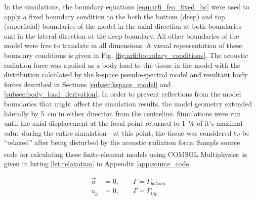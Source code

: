 			In the simulations, the boundary equations \ref{equ:arfi_fea_fixed_bc} were used to apply a fixed boundary condition to the both the bottom (deep) and top (superficial) boundaries of the model in the axial direction at both boundaries and in the lateral direction at the deep boundary. All other boundaries of the model were free to translate in all dimensions. A visual representation of these boundary conditions is given in Fig. \ref{fig:arfi:boundary_conditions}. The acoustic radiation force was applied as a body load to the tissue in the model with the distribution calculated by the k-space pseudo-spectral model and resultant body forces described in Sections \ref{subsec:kspace_model} and \ref{subsec:body_load_derivation}. In order to prevent reflections from the model boundaries that might affect the simulation results, the model geometry extended laterally by \SI{5}{\cm} in either direction from the centreline. Simulations were run until the axial displacement at the focal point returned to \SI{1}{\percent} of it's maximal value during the entire simulation---at this point, the tissue was considered to be ``relaxed'' after being disturbed by the acoustic radiation force. Sample source code for calculating these finite-element models using COMSOL Multiphysics\textsuperscript{\textregistered}\  is given in listing \ref{lst:relaxation} in Appendix \ref{app:source_code}.

			\begin{subequations}
				\label{equ:arfi_fea_fixed_bc}
				\begin{align}
					\vec{u} &= 0, \qquad \Gamma = \Gamma_{bottom} \\
					u_y &= 0, \qquad \Gamma = \Gamma_{top}
				\end{align}
			\end{subequations}

